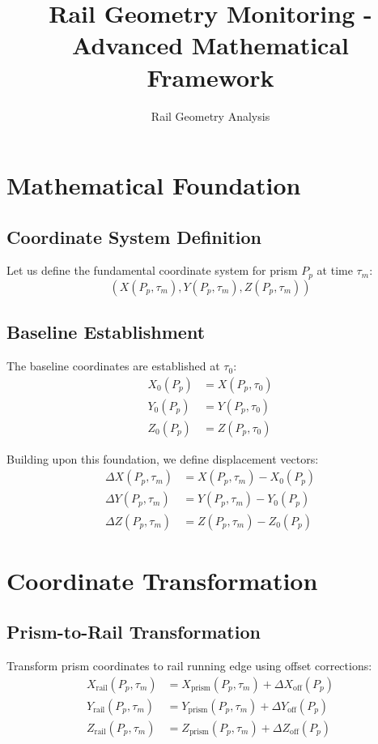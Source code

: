 \documentclass{article}
\title{Rail Geometry Monitoring - Advanced Mathematical Framework}
\author{Rail Geometry Analysis}
\date{}
\newcommand{\coord}[3]{(#1, #2, #3)}
\newcommand{\prism}[1]{P_{#1}}
\newcommand{\time}[1]{\tau_{#1}}
\newcommand{\DeltaX}[2]{\Delta X(#1, #2)}
\newcommand{\DeltaY}[2]{\Delta Y(#1, #2)}
\newcommand{\DeltaZ}[2]{\Delta Z(#1, #2)}
\newcommand{\Xoff}[1]{\Delta X_{\text{off}}(#1)}
\newcommand{\Yoff}[1]{\Delta Y_{\text{off}}(#1)}
\newcommand{\Zoff}[1]{\Delta Z_{\text{off}}(#1)}
\newcommand{\Xbase}[1]{X_0(#1)}
\newcommand{\Ybase}[1]{Y_0(#1)}
\newcommand{\Zbase}[1]{Z_0(#1)}
\begin{document}
\maketitle

\section{Mathematical Foundation}

\subsection{Coordinate System Definition}
Let us define the fundamental coordinate system for prism $\prism{p}$ at time $\time{m}$:
\begin{equation}
\coord{X(\prism{p}, \time{m})}{Y(\prism{p}, \time{m})}{Z(\prism{p}, \time{m})}
\end{equation}

\subsection{Baseline Establishment}
The baseline coordinates are established at $\time{0}$:
\begin{align}
\Xbase{\prism{p}} &= X(\prism{p}, \time{0}) \\
\Ybase{\prism{p}} &= Y(\prism{p}, \time{0}) \\
\Zbase{\prism{p}} &= Z(\prism{p}, \time{0})
\end{align}

Building upon this foundation, we define displacement vectors:
\begin{align}
\DeltaX{\prism{p}}{\time{m}} &= X(\prism{p}, \time{m}) - \Xbase{\prism{p}} \\
\DeltaY{\prism{p}}{\time{m}} &= Y(\prism{p}, \time{m}) - \Ybase{\prism{p}} \\
\DeltaZ{\prism{p}}{\time{m}} &= Z(\prism{p}, \time{m}) - \Zbase{\prism{p}}
\end{align}

\section{Coordinate Transformation}

\subsection{Prism-to-Rail Transformation}
Transform prism coordinates to rail running edge using offset corrections:
\begin{align}
X_{\text{rail}}(\prism{p}, \time{m}) &= X_{\text{prism}}(\prism{p}, \time{m}) + \Xoff{\prism{p}} \\
Y_{\text{rail}}(\prism{p}, \time{m}) &= Y_{\text{prism}}(\prism{p}, \time{m}) + \Yoff{\prism{p}} \\
Z_{\text{rail}}(\prism{p}, \time{m}) &= Z_{\text{prism}}(\prism{p}, \time{m}) + \Zoff{\prism{p}}
\end{align}
\end{document}
